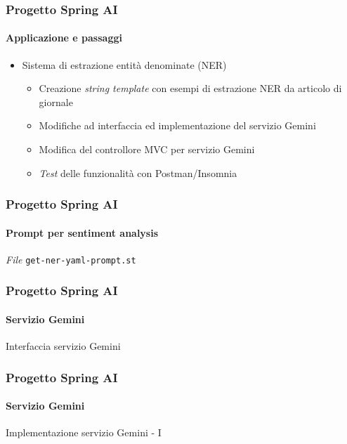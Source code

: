 %
\begin{frame}[t,fragile] \frametitle{Progetto Spring AI}
    \framesubtitle{Applicazione e passaggi}
    {\small
        \begin{itemize}[leftmargin=10pt,align=right]
            \item[\alert{\faArrowCircleRight}] Sistema di \alert{estrazione entità denominate} (NER)
            \begin{itemize}[leftmargin=10pt,align=right]
                \item[\alertedcircled{1}] Creazione \textit{string template} con esempi di estrazione NER da articolo di giornale
                \item[\alertedcircled{2}] Modifiche ad interfaccia ed implementazione del servizio Gemini
                \item[\alertedcircled{3}] Modifica del controllore MVC per servizio Gemini
                \item[\alertedcircled{4}] \textit{Test} delle funzionalità con Postman/Insomnia 
            \end{itemize}
        \end{itemize}
    }
\end{frame}
%
\begin{frame}[t,fragile] \frametitle{Progetto Spring AI}
    \framesubtitle{Prompt per sentiment analysis}
        \vspace*{-.7cm}
        \begin{block}{\textit{File} \texttt{get-ner-yaml-prompt.st}}
			{\Tiny}
    	\end{block}
\end{frame}
%
\begin{frame}[t,fragile] \frametitle{Progetto Spring AI}
    \framesubtitle{Servizio Gemini}
        \begin{block}{Interfaccia servizio Gemini}
{\tiny}
    \end{block}
\end{frame}
%
\begin{frame}[t,fragile] \frametitle{Progetto Spring AI}
    \framesubtitle{Servizio Gemini}
		\vspace*{-.7cm}
        \begin{block}{Implementazione servizio Gemini - I}
            {\tiny}
    \end{block}
\end{frame}
